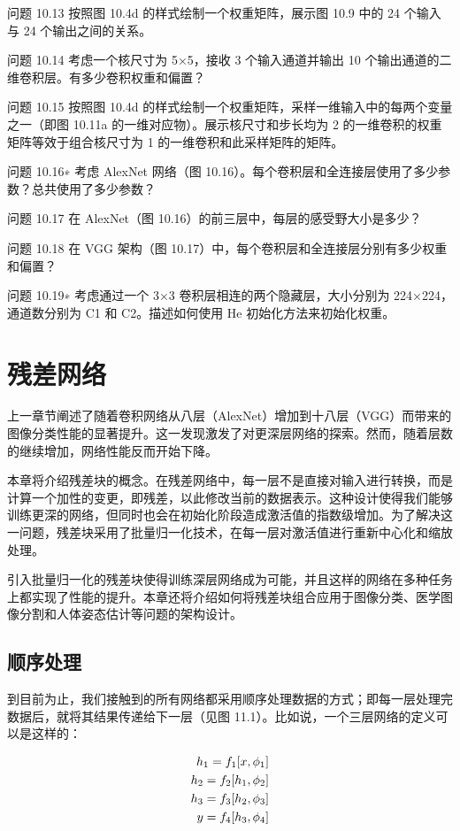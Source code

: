 \documentclass[lang=cn,newtx,10pt,scheme=chinese]{elegantbook}
\begin{document}
问题 10.13 按照图 10.4d 的样式绘制一个权重矩阵，展示图 10.9 中的 24 个输入与 24 个输出之间的关系。

问题 10.14 考虑一个核尺寸为 5×5，接收 3 个输入通道并输出 10 个输出通道的二维卷积层。有多少卷积权重和偏置？

问题 10.15 按照图 10.4d 的样式绘制一个权重矩阵，采样一维输入中的每两个变量之一（即图 10.11a 的一维对应物）。展示核尺寸和步长均为 2 的一维卷积的权重矩阵等效于组合核尺寸为 1 的一维卷积和此采样矩阵的矩阵。

问题 10.16∗ 考虑 AlexNet 网络（图 10.16）。每个卷积层和全连接层使用了多少参数？总共使用了多少参数？

问题 10.17 在 AlexNet（图 10.16）的前三层中，每层的感受野大小是多少？

问题 10.18 在 VGG 架构（图 10.17）中，每个卷积层和全连接层分别有多少权重和偏置？

问题 10.19∗ 考虑通过一个 3×3 卷积层相连的两个隐藏层，大小分别为 224×224，通道数分别为 C1 和 C2。描述如何使用 He 初始化方法来初始化权重。

\chapter{残差网络}

上一章节阐述了随着卷积网络从八层（AlexNet）增加到十八层（VGG）而带来的图像分类性能的显著提升。这一发现激发了对更深层网络的探索。然而，随着层数的继续增加，网络性能反而开始下降。

本章将介绍残差块的概念。在残差网络中，每一层不是直接对输入进行转换，而是计算一个加性的变更，即残差，以此修改当前的数据表示。这种设计使得我们能够训练更深的网络，但同时也会在初始化阶段造成激活值的指数级增加。为了解决这一问题，残差块采用了批量归一化技术，在每一层对激活值进行重新中心化和缩放处理。

引入批量归一化的残差块使得训练深层网络成为可能，并且这样的网络在多种任务上都实现了性能的提升。本章还将介绍如何将残差块组合应用于图像分类、医学图像分割和人体姿态估计等问题的架构设计。
\section{顺序处理}
到目前为止，我们接触到的所有网络都采用顺序处理数据的方式；即每一层处理完数据后，就将其结果传递给下一层（见图 11.1）。比如说，一个三层网络的定义可以是这样的：

\begin{align}
h_1 = f_1[x, \phi_1] \notag \\
h_2 = f_2[h_1, \phi_2] \notag \\
h_3 = f_3[h_2, \phi_3] \notag \\
y = f_4[h_3, \phi_4] 
\end{align} 
\end{document}
